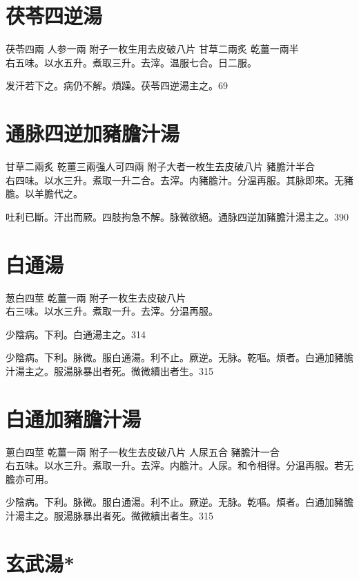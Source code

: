 \section{茯苓四逆湯}

茯苓{\scriptsize 四兩} 人参{\scriptsize 一兩} 附子{\scriptsize 一枚生用去皮破八片} 甘草{\scriptsize 二兩炙} 乾薑{\scriptsize 一兩半}\\
右五味。以水五升。煮取三升。去滓。温服七合。日二服。

发汗若下之。{\khaai 病仍}不解。煩躁。茯苓四逆湯主之。69

\section{通脉四逆加豬膽汁湯}

甘草{\scriptsize 二兩炙} 乾薑{\scriptsize 三兩强人可四兩} 附子{\scriptsize 大者一枚生去皮破八片} 豬膽汁{\scriptsize 半合}\\
右四味。以水三升。煮取一升二合。去滓。内豬膽汁。分温再服。其脉即來。无豬膽。以羊膽代之。

吐利已斷。汗出而厥。四肢拘急不解。脉微欲絕。通脉四逆加豬膽汁湯主之。390

\section{白通湯}

葱白{\scriptsize 四莖} 乾薑{\scriptsize 一兩} 附子{\scriptsize 一枚生去皮破八片}\\
右三味。以水三升。煮取一升。去滓。分温再服。

少陰病。下利。白通湯主之。314

少陰病。下利。脉微。服白通湯。利不止。厥逆。无脉。乾嘔。煩者。白通加豬膽汁湯主之。服湯脉暴出者死。微{\khaai 微}續{\khaai 出}者生。315

\section{白通加豬膽汁湯}

蔥白{\scriptsize 四莖} 乾薑{\scriptsize 一兩} 附子{\scriptsize 一枚生去皮破八片} 人尿{\scriptsize 五合} 豬膽汁{\scriptsize 一合}\\
右五味。以水三升。煮取一升。去滓。内膽汁。人尿。和令相得。分温再服。若无膽亦可用。

少陰病。下利。脉微。服白通湯。利不止。厥逆。无脉。乾嘔。煩者。白通加豬膽汁湯主之。服湯脉暴出者死。微{\khaai 微}續{\khaai 出}者生。315

\section{玄武湯*}

